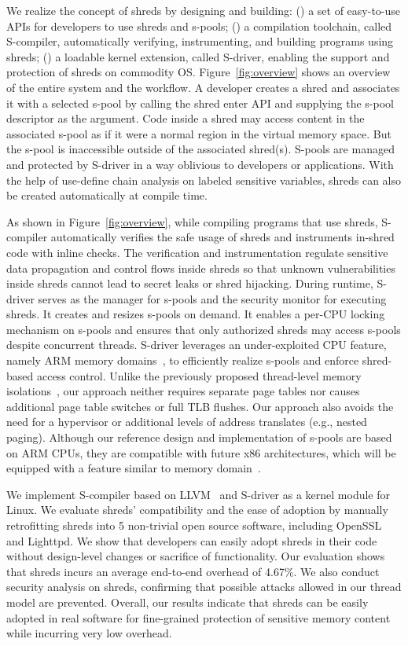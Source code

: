 We realize the concept of shreds by designing and building: () a set of easy-to-use APIs for developers to use shreds and s-pools; () a compilation toolchain, called S-compiler, automatically verifying, instrumenting, and building programs using shreds; () a loadable kernel extension, called S-driver, enabling the support and protection of shreds on commodity OS. Figure~\ref{fig:overview} shows an overview of the entire system and the workflow. A developer creates a shred and associates it with a selected s-pool by calling the shred enter API and supplying the s-pool descriptor as the argument. Code inside a shred may access content in the associated s-pool as if it were a normal region in the virtual memory space. But the s-pool is inaccessible outside of the associated shred(s). S-pools are managed and protected by S-driver in a way oblivious to developers or applications. With the help of use-define chain analysis on labeled sensitive variables, shreds can also be created automatically at compile time.

As shown in Figure~\ref{fig:overview}, while compiling programs that use shreds, S-compiler automatically verifies the safe usage of shreds and instruments in-shred code with inline checks. The verification and instrumentation regulate sensitive data propagation and control flows inside shreds so that unknown vulnerabilities inside shreds cannot lead to secret leaks or shred hijacking. During runtime, S-driver serves as the manager for s-pools and the security monitor for executing shreds. It creates and resizes s-pools on demand. It enables a per-CPU locking mechanism on s-pools and ensures that only authorized shreds may access s-pools despite concurrent threads.
S-driver leverages an under-exploited CPU feature, namely ARM memory domains~\cite{domains}, to efficiently realize s-pools and enforce shred-based access control. Unlike the previously proposed thread-level memory isolations~\cite{wedge}, our approach neither requires separate page tables nor causes additional page table switches or full TLB flushes. Our approach also avoids the need for a hypervisor or additional levels of address translates (e.g., nested paging). Although our reference design and implementation of s-pools are based on ARM CPUs, they are compatible with future x86 architectures, which will be equipped with a feature similar to memory domain~\cite{mpk15,mpk:rfc}.

We implement S-compiler based on LLVM~\cite{lattner2004llvm} and S-driver as a kernel module for Linux. We evaluate shreds' compatibility and the ease of adoption by manually retrofitting shreds into 5 non-trivial open source software, including OpenSSL and Lighttpd. We show that developers can easily adopt shreds in their code without design-level changes or sacrifice of functionality. Our evaluation shows that shreds incurs an average end-to-end overhead of 4.67\%. We also conduct security analysis on shreds, confirming that possible attacks allowed in our thread model are prevented. Overall, our results indicate that shreds can be easily adopted in real software for fine-grained protection of sensitive memory content while incurring very low overhead.

